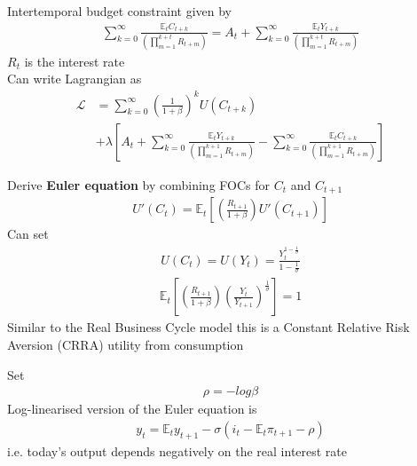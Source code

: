 \documentclass{beamer}
\begin{document}
\begin{frame}
  Intertemporal budget constraint given by  
\begin{align}
  \sum_{k=0}^{\infty} \frac{\mathbb{E}_t C_{t+k}}{\left(\prod_{m=1}^{k+t}R_{t+m} \right)} =
   A_t +   \sum_{k=0}^{\infty} \frac{\mathbb{E}_t Y_{t+k}}{\left(\prod_{m=1}^{k+t}R_{t+m} \right)}
\end{align}
$R_t$ is the interest rate\\
Can write Lagrangian as
\begin{align}
  \mathcal{L} &= \sum_{k=0}^{\infty} \left(\frac{1}{1+\beta} \right)^k U(C_{t+k}) \\ \nonumber
  &+ \lambda \left[A_t + \sum_{k=0}^{\infty} \frac{\mathbb{E}_t Y_{t+k}}{\left( \prod_{m=1}^{k+1} R_{t+m} \right)} -
  \sum_{k=0}^{\infty} \frac{\mathbb{E}_t C_{t+k}}{\left( \prod_{m=1}^{k+1} R_{t+m} \right)} \right ]
\end{align}
\end{frame}

\begin{frame}
  Derive \textbf{Euler equation} by combining FOCs for $C_t$ and $C_{t+1}$ 
\begin{align}  
  U'(C_t) = \mathbb{E}_t \left[ \left(\frac{R_{t+1}}{1+\beta} \right) U'(C_{t+1})\right] 
  \end{align}
  Can set
  \begin{align}
    U(C_t)=U(Y_t)=\frac{Y_t^{1-\frac{1}{\sigma}}}{1-\frac{1}{\sigma}}
  \end{align}
  \begin{align}
  \mathbb{E}_t \left[ \left( \frac{R_{t+1}}{1+\beta} \right) \left( \frac{Y_t}{Y_{t+1}} \right)^{\frac{1}{\sigma}} \right]=1 
 \end{align}
 Similar to the Real Business Cycle model this is a Constant Relative Risk Aversion (CRRA) utility from consumption
\end{frame}

\begin{frame}
  Set 
  \begin{align}
    \rho=-log\beta
  \end{align}
Log-linearised version of the Euler equation is 
\begin{align}  
y_t=\mathbb{E}_ty_{t+1} - \sigma(i_t - \mathbb{E}_t\pi_{t+1} - \rho) 
\end{align}
i.e. today's output depends negatively on the real interest rate
\end{frame}
\end{document}
